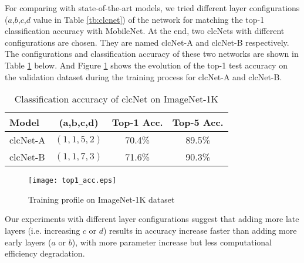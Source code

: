 \documentclass[10pt,twocolumn,letterpaper]{article}
\begin{document}
For comparing with state-of-the-art models, we tried different layer configurations ($a$,$b$,$c$,$d$ value in Table \ref{tb:clcnet}) of the network for matching the top-1 classification accuracy with MobileNet. At the end, two clcNets with different configurations are chosen. They are named clcNet-A and clcNet-B respectively. The configurations and classification accuracy of these two networks are shown in Table \ref{tb:exp_try} below. And Figure \ref{fig:train_profile} shows the evolution of the top-1 test accuracy on the validation dataset during the training process for clcNet-A and clcNet-B.
\begin{table}[h!]
\begin{center}
\begin{tabular}{l|c|c|c}
\hline
Model & (a,b,c,d) & Top-1 Acc.  & Top-5  Acc.\\
\hline\hline
clcNet-A  & $(1,1,5,2)$ & 70.4\%  & 89.5\% \\
clcNet-B  & $(1,1,7,3)$ & 71.6\%  & 90.3\% \\
\hline
\end{tabular}
\end{center}
\caption{Classification accuracy of clcNet on ImageNet-1K }
\label{tb:exp_try}
\end{table}
\begin{figure}[h!]
\begin{center}
\texttt{[image: top1\_acc.eps]}
\end{center}
   \caption{Training profile on ImageNet-1K dataset }
\label{fig:train_profile}
\end{figure}

Our experiments with different layer configurations suggest that adding more late layers (i.e. increasing $c$ or $d$) results in accuracy increase faster than adding more early layers ($a$ or $b$), with more parameter increase but less computational efficiency degradation.
\end{document}
